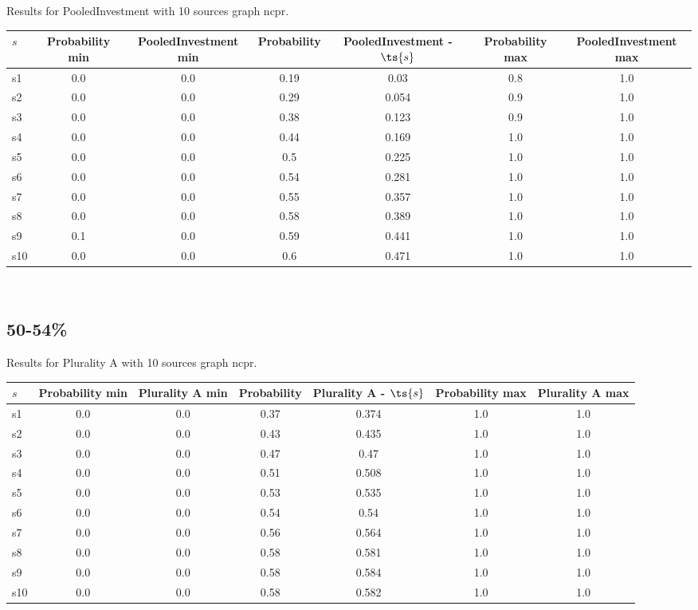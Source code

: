 \documentclass{article}
\begin{document}
\noindent Results for PooledInvestment with 10 sources graph ncpr.

\noindent\begin{tabular}{|l|c|c|c|c|c|c|}
\hline
$s$& Probability min & PooledInvestment min & Probability & PooledInvestment - $\ts{s}$ & Probability max & PooledInvestment max\\
\hline
s1 &0.0 & 0.0 & 0.19 & 0.03 & 0.8 & 1.0\\
\hline
s2 &0.0 & 0.0 & 0.29 & 0.054 & 0.9 & 1.0\\
\hline
s3 &0.0 & 0.0 & 0.38 & 0.123 & 0.9 & 1.0\\
\hline
s4 &0.0 & 0.0 & 0.44 & 0.169 & 1.0 & 1.0\\
\hline
s5 &0.0 & 0.0 & 0.5 & 0.225 & 1.0 & 1.0\\
\hline
s6 &0.0 & 0.0 & 0.54 & 0.281 & 1.0 & 1.0\\
\hline
s7 &0.0 & 0.0 & 0.55 & 0.357 & 1.0 & 1.0\\
\hline
s8 &0.0 & 0.0 & 0.58 & 0.389 & 1.0 & 1.0\\
\hline
s9 &0.1 & 0.0 & 0.59 & 0.441 & 1.0 & 1.0\\
\hline
s10 &0.0 & 0.0 & 0.6 & 0.471 & 1.0 & 1.0\\
\hline
\end{tabular}\\

\newpage

\subsection{50-54\%}

\noindent Results for Plurality A with 10 sources graph ncpr.

\noindent\begin{tabular}{|l|c|c|c|c|c|c|}
\hline
$s$& Probability min & Plurality A min & Probability & Plurality A - $\ts{s}$ & Probability max & Plurality A max\\
\hline
s1 &0.0 & 0.0 & 0.37 & 0.374 & 1.0 & 1.0\\
\hline
s2 &0.0 & 0.0 & 0.43 & 0.435 & 1.0 & 1.0\\
\hline
s3 &0.0 & 0.0 & 0.47 & 0.47 & 1.0 & 1.0\\
\hline
s4 &0.0 & 0.0 & 0.51 & 0.508 & 1.0 & 1.0\\
\hline
s5 &0.0 & 0.0 & 0.53 & 0.535 & 1.0 & 1.0\\
\hline
s6 &0.0 & 0.0 & 0.54 & 0.54 & 1.0 & 1.0\\
\hline
s7 &0.0 & 0.0 & 0.56 & 0.564 & 1.0 & 1.0\\
\hline
s8 &0.0 & 0.0 & 0.58 & 0.581 & 1.0 & 1.0\\
\hline
s9 &0.0 & 0.0 & 0.58 & 0.584 & 1.0 & 1.0\\
\hline
s10 &0.0 & 0.0 & 0.58 & 0.582 & 1.0 & 1.0\\
\hline
\end{tabular}\\
\end{document}
